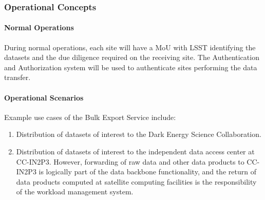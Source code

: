 \subsubsection{Operational Concepts}

\paragraph{Normal Operations}

During normal operations, each site will have a MoU with LSST identifying the datasets and the due diligence required on the receiving site. The Authentication and Authorization system will be used to authenticate sites performing the data transfer.

\paragraph{Operational Scenarios}

Example use cases of the Bulk Export Service include:

\begin{enumerate}

\item Distribution of datasets of interest to the Dark Energy Science Collaboration.

\item Distribution of datasets of interest to the independent data access center at CC-IN2P3. However, forwarding of raw data and other data products to CC-IN2P3 is logically part of the data backbone functionality, and the return of data products computed at satellite computing facilities is the responsibility of the workload management system.

\end{enumerate}

